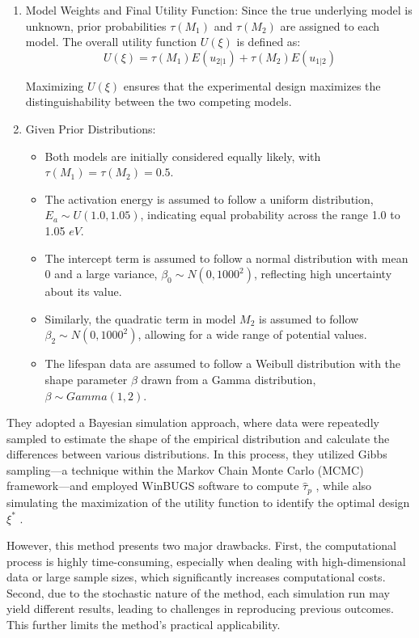 \begin{enumerate}
\item Model Weights and Final Utility Function: Since the true underlying model is unknown, prior probabilities $\tau(M_1)$ and $\tau(M_2)$ are assigned to each model. The overall utility function $U(\xi)$ is defined as:
\begin{equation}
U(\xi)=\tau(M_1)E(u_{2|1})+\tau(M_2)E(u_{1|2})
\end{equation}

Maximizing $U(\xi)$ ensures that the experimental design maximizes the distinguishability between the two competing models.

\item Given Prior Distributions:

\begin{itemize}

\item Both models are initially considered equally likely, with $\tau(M_1) = \tau(M_2) = 0.5$.
\item The activation energy is assumed to follow a uniform distribution, $E_a \sim U(1.0, 1.05)$, indicating equal probability across the range 1.0 to 1.05 $eV$.
\item The intercept term is assumed to follow a normal distribution with mean 0 and a large variance, $\beta_0 \sim N(0, 1000^2)$, reflecting high uncertainty about its value.
\item Similarly, the quadratic term in model $M_2$ is assumed to follow $\beta_2 \sim N(0, 1000^2)$, allowing for a wide range of potential values.
\item The lifespan data are assumed to follow a Weibull distribution with the shape parameter $\beta$ drawn from a Gamma distribution, $\beta \sim Gamma(1,2)$.

\end{itemize}

\end{enumerate}

\hspace*{8mm} They adopted a Bayesian simulation approach, where data were repeatedly sampled to estimate the shape of the empirical distribution and calculate the differences between various distributions. In this process, they utilized Gibbs sampling—a technique within the Markov Chain Monte Carlo (MCMC) framework—and employed WinBUGS software to compute $\hat{\tau}_p$ , while also simulating the maximization of the utility function to identify the optimal design $\xi^*$ .

\hspace*{8mm} However, this method presents two major drawbacks. First, the computational process is highly time-consuming, especially when dealing with high-dimensional data or large sample sizes, which significantly increases computational costs. Second, due to the stochastic nature of the method, each simulation run may yield different results, leading to challenges in reproducing previous outcomes. This further limits the method's practical applicability.


